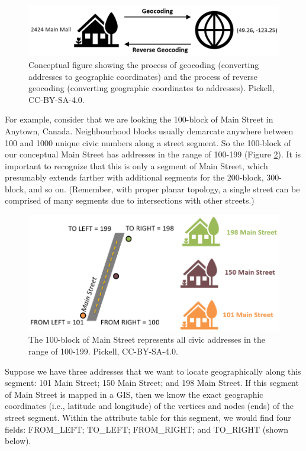 \documentclass[
]{book}
\begin{document}
\begin{figure}
\includegraphics[width=0.75\linewidth]{images/08-geocoding} \caption{Conceptual figure showing the process of geocoding (converting addresses to geographic coordinates) and the process of reverse geocoding (converting geographic coordinates to addresses). Pickell, CC-BY-SA-4.0.}\label{fig:8-geocoding}
\end{figure}

For example, consider that we are looking the 100-block of Main Street in Anytown, Canada. Neighbourhood blocks usually demarcate anywhere between 100 and 1000 unique civic numbers along a street segment. So the 100-block of our conceptual Main Street has addresses in the range of 100-199 (Figure \ref{fig:8-left-right-side}). It is important to recognize that this is only a segment of Main Street, which presumably extends farther with additional segments for the 200-block, 300-block, and so on. (Remember, with proper planar topology, a single street can be comprised of many segments due to intersections with other streets.)

\begin{figure}
\includegraphics[width=0.75\linewidth]{images/08-left-right-side} \caption{The 100-block of Main Street represents all civic addresses in the range of 100-199. Pickell, CC-BY-SA-4.0.}\label{fig:8-left-right-side}
\end{figure}

Suppose we have three addresses that we want to locate geographically along this segment: 101 Main Street; 150 Main Street; and 198 Main Street. If this segment of Main Street is mapped in a GIS, then we know the exact geographic coordinates (i.e., latitude and longitude) of the vertices and nodes (ends) of the street segment. Within the attribute table for this segment, we would find four fields: FROM\_LEFT; TO\_LEFT; FROM\_RIGHT; and TO\_RIGHT (shown below).
\end{document}
